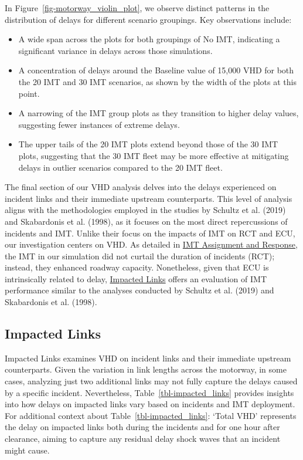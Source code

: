 \documentclass[fancy, oneside, mastersfancy, ms]{byuthesis}
\providecommand{\tightlist}{%
  \setlength{\itemsep}{0pt}\setlength{\parskip}{0pt}}\usepackage{longtable,booktabs,array}
\begin{document}
In Figure~\ref{fig-motorway_violin_plot}, we observe distinct patterns
in the distribution of delays for different scenario groupings. Key
observations include:

\begin{itemize}
\tightlist
\item
  A wide span across the plots for both groupings of No IMT, indicating
  a significant variance in delays across those simulations.
\item
  A concentration of delays around the Baseline value of 15,000 VHD for
  both the 20 IMT and 30 IMT scenarios, as shown by the width of the
  plots at this point.
\item
  A narrowing of the IMT group plots as they transition to higher delay
  values, suggesting fewer instances of extreme delays.
\item
  The upper tails of the 20 IMT plots extend beyond those of the 30 IMT
  plots, suggesting that the 30 IMT fleet may be more effective at
  mitigating delays in outlier scenarios compared to the 20 IMT fleet.
\end{itemize}

The final section of our VHD analysis delves into the delays experienced
on incident links and their immediate upstream counterparts. This level
of analysis aligns with the methodologies employed in the studies by
Schultz et al. (2019) and Skabardonis et al. (1998), as it focuses on
the most direct repercussions of incidents and IMT. Unlike their focus
on the impacts of IMT on RCT and ECU, our investigation centers on VHD.
As detailed in \protect\hyperlink{sec-imt_response}{IMT Assignment and
Response}, the IMT in our simulation did not curtail the duration of
incidents (RCT); instead, they enhanced roadway capacity. Nonetheless,
given that ECU is intrinsically related to delay,
\protect\hyperlink{sec-impacted}{Impacted Links} offers an evaluation of
IMT performance similar to the analyses conducted by Schultz et al.
(2019) and Skabardonis et al. (1998).

\hypertarget{sec-impacted}{%
\subsection{Impacted Links}\label{sec-impacted}}

Impacted Links examines VHD on incident links and their immediate
upstream counterparts. Given the variation in link lengths across the
motorway, in some cases, analyzing just two additional links may not
fully capture the delays caused by a specific incident. Nevertheless,
Table~\ref{tbl-impacted_links} provides insights into how delays on
impacted links vary based on incidents and IMT deployment. For
additional context about Table~\ref{tbl-impacted_links}: `Total VHD'
represents the delay on impacted links both during the incidents and for
one hour after clearance, aiming to capture any residual delay shock
waves that an incident might cause.
\end{document}
